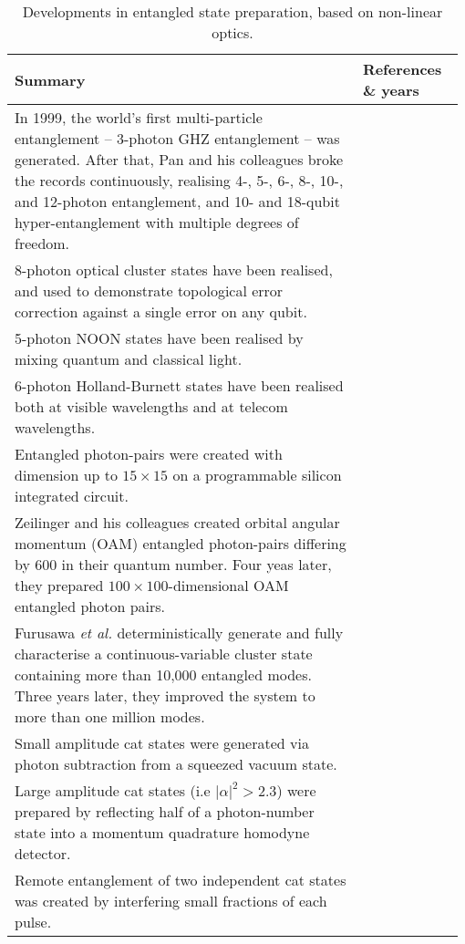 \begin{table*}[!htbp]
	\begin{tabular}{|p{0.755\linewidth}|p{0.22\linewidth}|}
		\hline
	\textbf{Summary} & \textbf{References \& years} \\	\hline \hline
        In 1999, the world's first multi-particle entanglement -- 3-photon GHZ entanglement -- was generated. After that, Pan and his colleagues broke the records continuously, realising 4-, 5-, 6-, 8-, 10-, and 12-photon entanglement, and 10- and 18-qubit hyper-entanglement\index{Hyper-entanglement} with multiple degrees of freedom. & \cite{bib:bouwmeester1999observation, bib:wang201818, bib:zhong201812}  \\
		\hline
		8-photon optical cluster states have been realised, and used to demonstrate topological error correction against a single error on any qubit. &  \cite{bib:yao2012experimental}  \\
		\hline
		5-photon NOON states have been realised by mixing quantum and classical light. & \cite{bib:afek2010high} \\
		\hline
		6-photon Holland-Burnett states\index{Holland-Burnett states} have been realised both at visible wavelengths and at telecom wavelengths. & \cite{bib:xiang2012optimal,  bib:jin2016detection} \\
		\hline
		Entangled photon-pairs were created with dimension up to \mbox{$15\times 15$} on a programmable silicon integrated circuit. & \cite{bib:wang2018multidimensional} \\
		\hline
		Zeilinger and his colleagues created orbital angular momentum (OAM) entangled photon-pairs differing by 600 in their quantum number. Four yeas later, they prepared \mbox{$100\times 100$}-dimensional OAM entangled photon pairs. & \cite{bib:fickler2012quantum} \\
		\hline
		Furusawa \textit{et al.} deterministically generate and fully characterise a continuous-variable cluster state containing more than 10,000 entangled modes. Three years later, they improved the system to more than one million modes. & \cite{bib:yokoyama2013ultra, bib:yoshikawa2016invited} \\
		\hline
        Small amplitude cat states were generated via photon subtraction from a squeezed vacuum state. & \cite{bib:neergaard2006generation,  bib:ourjoumtsev2006generating, bib:wakui2007photon} \\
        \hline
        Large amplitude cat states (i.e \mbox{${\left| \alpha  \right|^2} > 2.3$}) were prepared by reflecting half of a photon-number state into a momentum quadrature homodyne detector. & \cite{bib:ourjoumtsev2007generation, bib:takahashi2008generation} \\
		\hline
		Remote entanglement of two independent cat states was created by interfering small fractions of each pulse. & \cite{bib:ourjoumtsev2009preparation} \\
		\hline
	\end{tabular}
	\captionspacetab \caption{Developments in entangled state preparation, based on non-linear optics.} \label{tab:entangled_states}
\end{table*}

